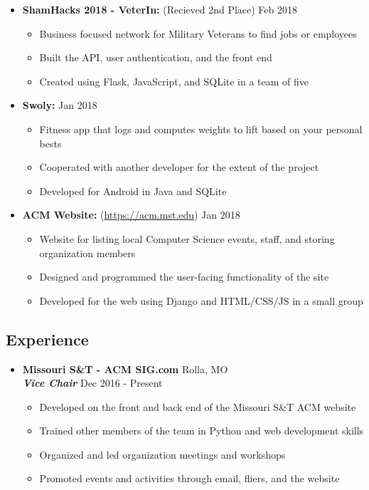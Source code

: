 \documentclass[10pt,oneside]{article}
\begin{document}
\begin{itemize}
	\item[] \textbf{ShamHacks 2018 - VeterIn:} (Recieved 2nd Place)
		\hfill Feb 2018
		\begin{itemize}
			\item[\textbullet] Business focused network for Military Veterans to find jobs or employees
			\item[\textbullet] Built the API, user authentication, and the front end
			\item[\textbullet] Created using Flask, JavaScript, and SQLite in a team of five
		\end{itemize}
			
	\item[] \textbf{Swoly:}
		\hfill Jan 2018
		\begin{itemize}
			\item[\textbullet] Fitness app that logs and computes weights to lift based on your personal bests
			\item[\textbullet] Cooperated with another developer for the extent of the project
			\item[\textbullet] Developed for Android in Java and SQLite
		\end{itemize}
	\item[] \textbf{ACM Website:} (\url{https://acm.mst.edu})
		\hfill Jan 2018
		\begin{itemize}
			\item [\textbullet] Website for listing local Computer Science events, staff, and storing organization members
			\item[\textbullet] Designed and programmed the user-facing functionality of the site
			\item[\textbullet] Developed for the web using Django and HTML/CSS/JS in a small group
		\end{itemize}
\end{itemize}

\vspace*{-16pt}
\subsection*{Experience}

\begin{itemize}
	\item[] \textbf{Missouri S\&T - ACM SIG.com}
		\hfill Rolla, MO\\
		\textit{\textbf{Vice Chair}}
		\hfill Dec 2016 - Present
		\begin{itemize}
			\item[\textbullet] Developed on the front and back end of the Missouri S\&T ACM website
			\item[\textbullet] Trained other members of the team in Python and web development skills
			\item[\textbullet] Organized and led organization meetings and workshops
			\item[\textbullet] Promoted events and activities through email, fliers, and the website
		\end{itemize}
\end{itemize}
\end{document}
